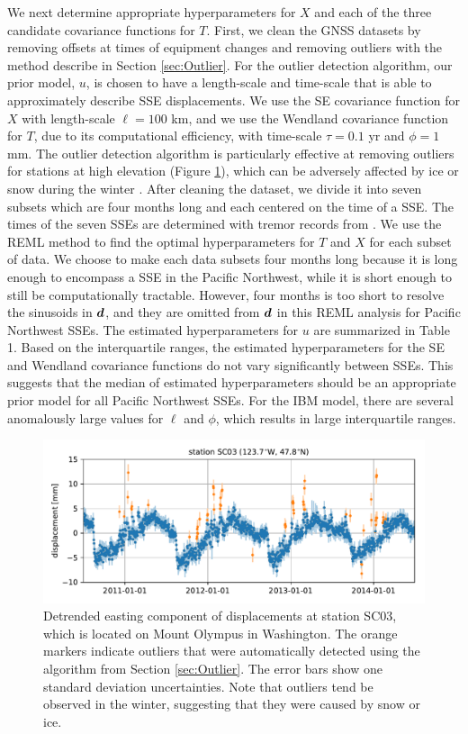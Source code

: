 \documentclass[extra,mreferee]{gji}
\begin{document}
We next determine appropriate hyperparameters for $X$ and each of the three candidate covariance functions for $T$. First, we clean the GNSS datasets by removing offsets at times of equipment changes and removing outliers with the method describe in Section \ref{sec:Outlier}. For the outlier detection algorithm, our prior model, $u$, is chosen to have a length-scale and time-scale that is able to approximately describe SSE displacements. We use the SE covariance function for $X$ with length-scale $\ell = 100$ km, and we use the Wendland covariance function for $T$, due to its computational efficiency, with time-scale $\tau = 0.1$ yr and $\phi = 1$ mm.  The outlier detection algorithm is particularly effective at removing outliers for stations at high elevation (Figure \ref{fig:Outliers}), which can be adversely affected by ice or snow during the winter \citep{Lisowski2008}. After cleaning the dataset, we divide it into seven subsets which are four months long and each centered on the time of a SSE. The times of the seven SSEs are determined with tremor records from \cite{Wech2010}. We use the REML method to find the optimal hyperparameters for $T$ and $X$ for each subset of data. We choose to make each data subsets four months long because it is long enough to encompass a SSE in the Pacific Northwest, while it is short enough to still be computationally tractable. However, four months is too short to resolve the sinusoids in $\mitbf{d}$, and they are omitted from $\mitbf{d}$ in this REML analysis for Pacific Northwest SSEs. The estimated hyperparameters for $u$ are summarized in Table 1. Based on the interquartile ranges, the estimated hyperparameters for the SE and Wendland covariance functions do not vary significantly between SSEs. This suggests that the median of estimated hyperparameters should be an appropriate prior model for all Pacific Northwest SSEs. For the IBM model, there are several anomalously large values for $\ell$ and $\phi$, which results in large interquartile ranges.   

\begin{figure}
\includegraphics{figures/outliers/outliers.pdf}
\caption{Detrended easting component of displacements at station SC03, which is located on Mount Olympus in Washington. The orange markers indicate outliers that were automatically detected using the algorithm from Section \ref{sec:Outlier}. The error bars show one standard deviation uncertainties. Note that outliers tend be observed in the winter, suggesting that they were caused by snow or ice.}   
\label{fig:Outliers}
\end{figure}
\end{document}
